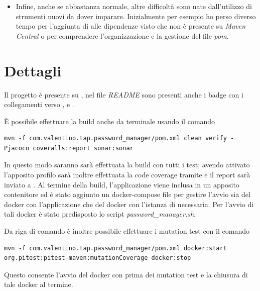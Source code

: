 \begin{itemize}
	\item Infine, anche se abbastanza normale, altre difficoltà sono nate dall'utilizzo di strumenti nuovi da dover imparare. Inizialmente per esempio ho perso diverso tempo per l'aggiunta di  alle dipendenze visto che non è presente su \emph{Maven Central} o per comprendere l'organizzazione e la gestione del file \emph{pom}.
\end{itemize}

\chapter{Dettagli}
Il progetto è presente su , nel file \emph{README} sono presenti anche i badge con i collegamenti verso ,  e . 

\noindent
È possibile effettuare la build anche da terminale usando il comando 
\begin{verbatim}
mvn -f com.valentino.tap.password_manager/pom.xml clean verify -Pjacoco coveralls:report sonar:sonar
\end{verbatim}
In questo modo saranno sarà effettuata la build con tutti i test; avendo attivato l'apposito profilo sarà inoltre effettuata la code coverage tramite  e il report sarà inviato a . Al termine della build, l'applicazione viene inclusa in un apposito contenitore ed è stato aggiunto un docker-compose file per gestire l'avvio sia del docker con l'applicazione che del docker con l'istanza di  necessaria. Per l'avvio di tali docker è stato predisposto lo script \emph{password\_manager.sh}. 

\noindent
Da riga di comando è inoltre possibile effettuare i mutation test con il comando
\begin{verbatim}
mvn -f com.valentino.tap.password_manager/pom.xml docker:start org.pitest:pitest-maven:mutationCoverage docker:stop
\end{verbatim}
Questo consente l'avvio del docker con  prima dei mutation test e la chiusura di tale docker al termine. 

